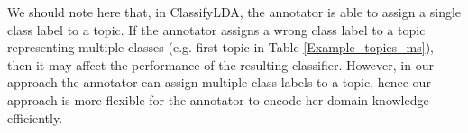 \documentclass[11pt]{article}
\begin{document}
We should note here that, in ClassifyLDA, the annotator is able to assign a single class label to a topic. If the annotator assigns a wrong class label to a topic representing multiple classes (e.g. first topic in Table \ref{Example_topics_ms}), then it may affect the performance of the resulting classifier. However, in our approach the annotator can assign multiple class labels to a topic, hence our approach is more flexible for the annotator to encode her domain knowledge efficiently. 
\end{document}
